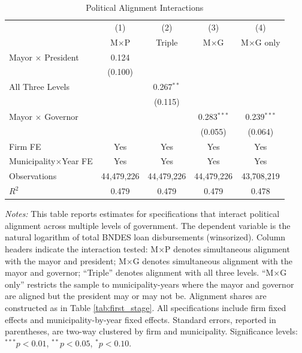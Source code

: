 \documentclass{article}
\begin{document}
\begin{table}[H]
    \centering
    \caption{Political Alignment Interactions}
    \label{tab:interactions}
    \begin{threeparttable}
        \begin{tabular}{lcccc}
            \toprule
                                        & (1)        & (2)          & (3)           & (4)             \\
                                        & M$\times$P & Triple       & M$\times$G    & M$\times$G only \\
            \midrule
            Mayor $\times$ President    & 0.124      &              &               &                 \\
                                        & (0.100)    &              &               &                 \\
            All Three Levels            &            & 0.267$^{**}$ &               &                 \\
                                        &            & (0.115)      &               &                 \\
            Mayor $\times$ Governor     &            &              & 0.283$^{***}$ & 0.239$^{***}$   \\
                                        &            &              & (0.055)       & (0.064)         \\
            \midrule
            Firm FE                     & Yes        & Yes          & Yes           & Yes             \\
            Municipality$\times$Year FE & Yes        & Yes          & Yes           & Yes             \\
            \midrule
            Observations                & 44,479,226 & 44,479,226   & 44,479,226    & 43,708,219      \\
            $R^2$                       & 0.479      & 0.479        & 0.479         & 0.478           \\
            \bottomrule
        \end{tabular}
        \begin{tablenotes}
            \small
            \item \textit{Notes:} This table reports estimates for specifications that interact political alignment across multiple levels of government. The dependent variable is the natural logarithm of total BNDES loan disbursements (winsorized). Column headers indicate the interaction tested: M$\times$P denotes simultaneous alignment with the mayor and president; M$\times$G denotes simultaneous alignment with the mayor and governor; ``Triple'' denotes alignment with all three levels. ``M$\times$G only'' restricts the sample to municipality-years where the mayor and governor are aligned but the president may or may not be. Alignment shares are constructed as in Table \ref{tab:first_stage}. All specifications include firm fixed effects and municipality-by-year fixed effects. Standard errors, reported in parentheses, are two-way clustered by firm and municipality. Significance levels: $^{***}p<0.01$, $^{**}p<0.05$, $^{*}p<0.10$.

\end{tablenotes}
\end{threeparttable}
\end{table}
\end{document}
